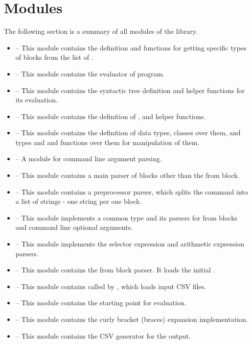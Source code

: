 \section{Modules}
The following section is a summary of all modules of the library.
\begin{itemize}
    \item {} -- This module contains the  definition and functions for getting specific types of blocks from the list of .
    \item {} -- This module contains the evaluator of \break{} program.
    \item {} -- This module contains the syntactic tree definition and helper functions for its evaluation.
    \item {} -- This module contains the definition of ,  and helper functions.
    \item {} -- This module contains the definition of  
        data types, classes over them, and types  and  and functions over them for manipulation of them.
    \item {} -- A module for command line argument parsing.
    \item {} -- This module contains a main parser of blo\-cks other than the from block.
    \item {} -- This module contains a preprocessor parser, which splits the command into a list of strings - one string per one block.
    \item {} -- This module implements a common  type and its parsers for from blocks and command line optional arguments.
    \item {} -- This module implements the selector expression and arithmetic expression parsers.
    \item {} -- This module contains the from block parser. It loads the initial .
    \item {} -- This module contains  called by , which loads input CSV files.
    \item {} -- This module contains the starting point for  evaluation.
    \item {} -- This module contains the curly bra\-cket (braces) expansion implementation.
    \item {} -- This module contains the CSV generator for the output.
\end{itemize}

